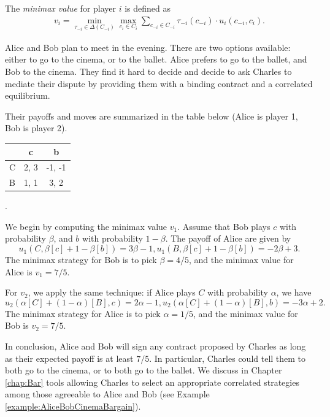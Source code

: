\begin{definition}[Minimax]
The \emph{minimax value} for player $i$ is defined as
\begin{align*}
v_i = \min_{\tau_{-i} \in \Delta(C_{-i})} \max_{c_i \in C_i} \sum_{c_{-i} \in C_{-i}} \tau_{-i}(c_{-i}) \cdot u_i(c_{-i}, c_i).
\end{align*}
\end{definition}
\begin{example}
\label{ch5:ex:minimax}
Alice and Bob plan to meet in the evening. There are two options available: either to go to the cinema, or to the ballet.
Alice prefers to go to the ballet, and Bob to the cinema. They find it hard to decide and decide to ask Charles to mediate their dispute by providing them with a binding contract and a correlated equilibrium.

Their payoffs and moves are summarized in the table below (Alice is player 1, Bob is player 2).
\begin{center}
\begin{tabular}{c | c  c}
& c & b\\
\hline
C & 2, 3 & -1, -1  \\
B & 1, 1 & 3, 2
\end{tabular}
.
\end{center}

We begin by computing the minimax value $v_1$. Assume that Bob plays $c$ with probability $\beta$, and $b$ with probability $1-\beta$.
The payoff of Alice are given by
$$ u_{1}(C, \beta[c] + 1-\beta[b]) = 3\beta - 1, u_{1}(B, \beta[c] + 1-\beta[b]) = -2\beta + 3.  $$
The minimax strategy for Bob is to pick $\beta = 4/5$, and the minimax value for Alice is $v_1 = 7/5$.

For $v_2$, we apply the same technique: if Alice plays $C$ with probability $\alpha$, we have
$$ u_{2}(\alpha [C] + (1-\alpha)[B], c) = 2 \alpha - 1, u_{2}(\alpha [C] + (1-\alpha)[B], b) = -3\alpha + 2.  $$
The minimax strategy for Alice is to pick $\alpha = 1/5$, and the minimax value for Bob is $v_2 = 7/5$.

In conclusion, Alice and Bob will sign any contract proposed by Charles as long as their expected payoff is at least $7/5$. In particular, Charles could tell them to both go to the cinema, or to both go to the ballet.
We  discuss in Chapter \ref{chap:Bar} tools allowing Charles to select an appropriate correlated strategies among those agreeable to Alice and Bob (see Example \ref{example:AliceBobCinemaBargain}).

\end{example}

